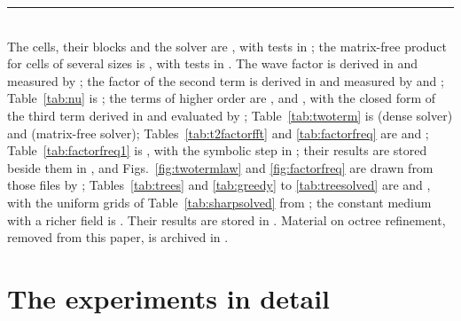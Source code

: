 \documentclass[11pt,a4paper]{article}
\begin{document}
\vfill
\noindent\rule{\linewidth}{0.4pt}\\
{\footnotesize The cells, their blocks and the solver are ,
with tests in ; the matrix-free product for
cells of several sizes is , with tests in
. The wave factor is derived in
 and measured by
; the factor of the second term is derived in
 and measured by  and
; Table~\ref{tab:nu} is
; the terms of higher order are
,  and
, with the closed form of the third term derived in
 and evaluated by ;
Table~\ref{tab:twoterm} is  (dense solver) and
 (matrix-free solver); Tables~\ref{tab:t2factorfft} and
\ref{tab:factorfreq} are  and
; Table~\ref{tab:factorfreq1} is
, with the symbolic step in
; their results are stored beside them in ,
and Figs.~\ref{fig:twotermlaw} and \ref{fig:factorfreq} are drawn from those files by
; Tables~\ref{tab:trees} and \ref{tab:greedy} to \ref{tab:treesolved} are
 and
, with the uniform grids of
Table~\ref{tab:sharpsolved} from ; the constant medium with a richer
field is . Their results are stored in
. Material on octree refinement, removed from this paper, is
archived in .}



\appendix
\section{The experiments in detail}\label{app:experiments}
\end{document}
